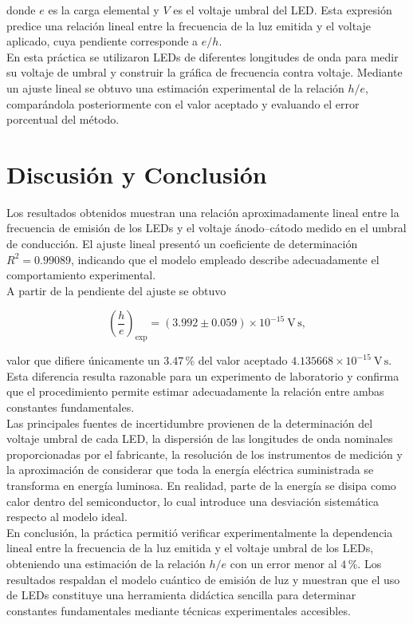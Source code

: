\documentclass{article}
\begin{document}
donde $e$ es la carga elemental y $V$ es el voltaje umbral del LED. Esta
expresión predice una relación lineal entre la frecuencia de la luz emitida y el
voltaje aplicado, cuya pendiente corresponde a $e/h$.\\

En esta práctica se utilizaron LEDs de diferentes longitudes de onda para medir
su voltaje de umbral y construir la gráfica de frecuencia contra voltaje.
Mediante un ajuste lineal se obtuvo una estimación experimental de la relación
$h/e$, comparándola posteriormente con el valor aceptado y evaluando el error
porcentual del método.

\section{Discusión y Conclusión}

Los resultados obtenidos muestran una relación aproximadamente lineal entre la
frecuencia de emisión de los LEDs y el voltaje ánodo--cátodo medido en el umbral
de conducción. El ajuste lineal presentó un coeficiente de determinación
$R^2=0.99089$, indicando que el modelo empleado describe adecuadamente el
comportamiento experimental.\\

A partir de la pendiente del ajuste se obtuvo

\[
\left(\frac{h}{e}\right)_{\mathrm{exp}}
=(3.992\pm0.059)\times10^{-15}\ \mathrm{V\,s},
\]

valor que difiere únicamente un $3.47\,\%$ del valor aceptado
$4.135668\times10^{-15}\ \mathrm{V\,s}$. Esta diferencia resulta razonable para
un experimento de laboratorio y confirma que el procedimiento permite estimar
adecuadamente la relación entre ambas constantes fundamentales.\\

Las principales fuentes de incertidumbre provienen de la determinación del
voltaje umbral de cada LED, la dispersión de las longitudes de onda nominales
proporcionadas por el fabricante, la resolución de los instrumentos de medición
y la aproximación de considerar que toda la energía eléctrica suministrada se
transforma en energía luminosa. En realidad, parte de la energía se disipa como
calor dentro del semiconductor, lo cual introduce una desviación sistemática
respecto al modelo ideal.\\

En conclusión, la práctica permitió verificar experimentalmente la dependencia
lineal entre la frecuencia de la luz emitida y el voltaje umbral de los LEDs,
obteniendo una estimación de la relación $h/e$ con un error menor al $4\,\%$.
Los resultados respaldan el modelo cuántico de emisión de luz y muestran que el
uso de LEDs constituye una herramienta didáctica sencilla para determinar
constantes fundamentales mediante técnicas experimentales accesibles.
\end{document}
